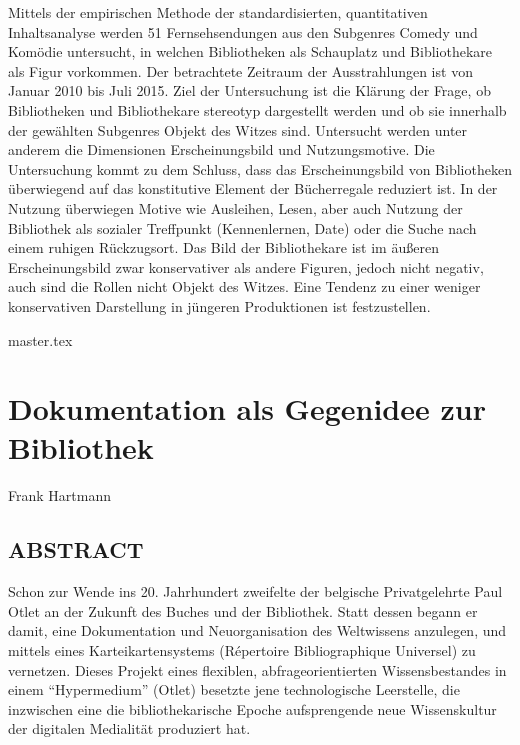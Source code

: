 \documentclass[10.5pt,a5paper,twoside]{memoir}
\makeatletter
\DeclareRobustCommand\authortoctext[1]{%
{\addvspace{20pt}\nopagebreak\leftskip0em\relax
\rightskip \@tocrmarg\relax
\noindent\itshape#1\par\addvspace{-7pt}}}
\newcommand\authortoc[1]{%
  \gdef\chapterauthor{#1}%
  \addtocontents{toc}{\authortoctext{#1}}}
\makeatother
\begin{document}
{\small Mittels der empirischen Methode der standardisierten, quantitativen
Inhaltsanalyse werden 51 Fernsehsendungen aus den Subgenres Comedy und
Komödie untersucht, in welchen Bibliotheken als Schauplatz und
Bibliothekare als Figur vorkommen. Der betrachtete Zeitraum der
Ausstrahlungen ist von Januar 2010 bis Juli 2015. Ziel der Untersuchung
ist die Klärung der Frage, ob Bibliotheken und Bibliothekare stereotyp
dargestellt werden und ob sie innerhalb der gewählten Subgenres Objekt
des Witzes sind. Untersucht werden unter anderem die Dimensionen
Erscheinungsbild und Nutzungsmotive. Die Untersuchung kommt zu dem
Schluss, dass das Erscheinungsbild von Bibliotheken überwiegend auf das
konstitutive Element der Bücherregale reduziert ist. In der Nutzung
überwiegen Motive wie Ausleihen, Lesen, aber auch Nutzung der Bibliothek
als sozialer Treffpunkt (Kennenlernen, Date) oder die Suche nach einem
ruhigen Rückzugsort. Das Bild der Bibliothekare ist im äußeren
Erscheinungsbild zwar konservativer als andere Figuren, jedoch nicht
negativ, auch sind die Rollen nicht Objekt des Witzes. Eine Tendenz zu
einer weniger konservativen Darstellung in jüngeren Produktionen ist
festzustellen.}

\newpage 

{master.tex}

\authortoc{\\Frank Hartmann}
\chapter*[Dokumentation als Gegenidee zur Bibliothek]{Dokumentation als Gegenidee zur Bibliothek}
\begin{flushright}
{\large Frank Hartmann}
\end{flushright}

\vspace{5mm}

\section*{ABSTRACT}

{\small
	Schon zur Wende ins 20. Jahrhundert zweifelte der belgische Privatgelehrte Paul Otlet an der Zukunft des Buches und der Bibliothek. Statt dessen begann er damit, eine Dokumentation und Neuorganisation des Weltwissens anzulegen, und mittels eines Karteikartensystems (Répertoire Bibliographique Universel) zu vernetzen. Dieses Projekt eines flexiblen, abfrageorientierten Wissensbestandes in einem \enquote{Hypermedium} (Otlet) besetzte jene technologische Leerstelle, die inzwischen eine die bibliothekarische Epoche aufsprengende neue Wissenskultur der digitalen Medialität produziert hat.}
\end{document}
